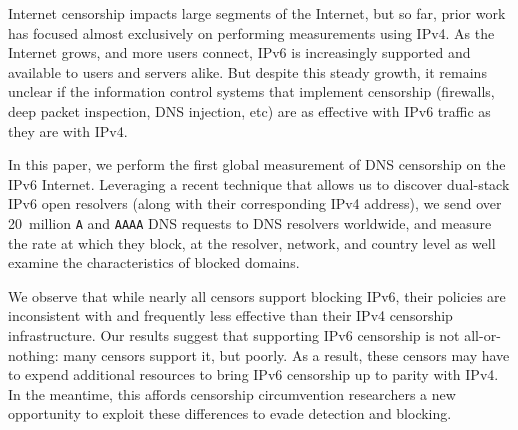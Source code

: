 

Internet censorship impacts large segments of the Internet, but so far, prior
work has focused almost exclusively on performing measurements using IPv4. As
the Internet grows, and more users connect, IPv6 is increasingly supported and
available to users and servers alike. But despite this steady growth, it remains
unclear if the information control systems that implement censorship (firewalls,
deep packet inspection, DNS injection, etc) are as effective with IPv6 traffic
as they are with IPv4.

In this paper, we perform the first global measurement of DNS censorship on the
IPv6 Internet. Leveraging a recent technique that allows us to discover
dual-stack IPv6 open resolvers (along with their corresponding IPv4 address), we
send over 20~million {\tt A} and {\tt AAAA} DNS requests to DNS resolvers
worldwide, and measure the rate at which they block, at the resolver, network,
and country level as well examine the characteristics of blocked domains.

We observe that while nearly all censors support blocking IPv6, their policies
are inconsistent with and frequently less effective than their IPv4 censorship
infrastructure. Our results suggest that supporting IPv6 censorship is not
all-or-nothing: many censors support it, but poorly.  As a result, these censors
may have to expend additional resources to bring IPv6 censorship up to parity
with IPv4. In the meantime, this affords censorship circumvention researchers a
new opportunity to exploit these differences to evade detection and blocking.
